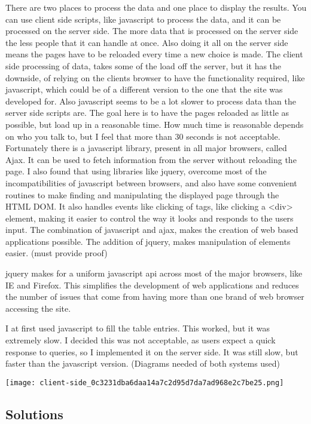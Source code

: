 \documentclass[11pt]{article}
\begin{document}
There are two places to process the data and one place to display the
results. You can use client side scripts, like javascript to process
the data, and it can be processed on the server side.  The more data
that is processed on the server side the less people that it can
handle at once.  Also doing it all on the server side means the pages
have to be reloaded every time a new choice is made.  The client side
processing of data, takes some of the load off the server, but it has
the downside, of relying on the clients browser to have the
functionality required, like javascript, which could be of a different
version to the one that the site was developed for.  Also javascript
seems to be a lot slower to process data than the server side scripts
are.  The goal here is to have the pages reloaded as little as
possible, but load up in a reasonable time.  How much time is
reasonable depends on who you talk to, but I feel that more than 30
seconds is not acceptable.  Fortunately there is a javascript library,
present in all major browsers, called Ajax.  It can be used to fetch
information from the server without reloading the page.  I also found
that using libraries like jquery, overcome most of the
incompatibilities of javascript between browsers, and also have some
convenient routines to make finding and manipulating the displayed
page through the HTML DOM.  It also handles events like clicking of
tags, like clicking a <div> element, making it easier to control the
way it looks and responds to the users input.  The combination of
javascript and ajax, makes the creation of web based applications
possible.  The addition of jquery, makes manipulation of elements
easier.  (must provide proof)

jquery makes for a uniform javascript api across most of the major
browsers, like IE and Firefox.  This simplifies the development of web
applications and reduces the number of issues that come from having
more than one brand of web browser accessing the site.


I at first used javascript to fill the table entries.  This worked,
but it was extremely slow.  I decided this was not acceptable, as
users expect a quick response to queries, so I implemented it on the
server side.  It was still slow, but faster than the javascript
version.  (Diagrams needed of both systems used)


\texttt{[image: client-side\_0c3231dba6daa14a7c2d95d7da7ad968e2c7be25.png]}
\subsection{Solutions}
\label{sec-2_3}
\end{document}
